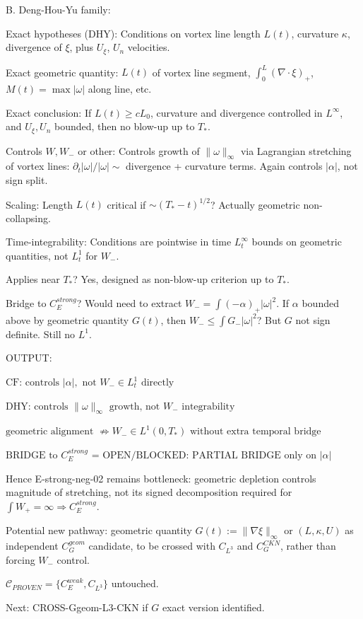 \documentclass[11pt]{article}
\begin{document}
B. Deng-Hou-Yu family:

Exact hypotheses (DHY):
Conditions on vortex line length $L(t)$, curvature $\kappa$, divergence of $\xi$, plus $U_\xi$, $U_n$ velocities.

Exact geometric quantity:
$L(t)$ of vortex line segment, $\int_0^{L} (\nabla\cdot\xi)_+$, $M(t)=\max |\omega|$ along line, etc.

Exact conclusion:
If $L(t)\ge c L_0$, curvature and divergence controlled in $L^\infty$, and $U_\xi,U_n$ bounded, then no blow-up up to $T_*$.

Controls $W,W_-$ or other:
Controls growth of $\|\omega\|_\infty$ via Lagrangian stretching of vortex lines: $\partial_t |\omega| / |\omega| \sim$ divergence + curvature terms. Again controls $|\alpha|$, not sign split.

Scaling:
Length $L(t)$ critical if $\sim (T_*-t)^{1/2}$? Actually geometric non-collapsing.

Time-integrability:
Conditions are pointwise in time $L^\infty_t$ bounds on geometric quantities, not $L^1_t$ for $W_-$.

Applies near $T_*$? Yes, designed as non-blow-up criterion up to $T_*$.

Bridge to $C_E^{strong}$?
Would need to extract $W_-=\int (-\alpha)_+ |\omega|^2$. If $\alpha$ bounded above by geometric quantity $G(t)$, then $W_-\le \int G_- |\omega|^2$? But $G$ not sign definite. Still no $L^1$.

OUTPUT:

$\boxed{\text{CF: controls }|\alpha|,\text{ not }W_-\in L^1_t\text{ directly}}$

$\boxed{\text{DHY: controls }\|\omega\|_\infty\text{ growth, not }W_-\text{ integrability}}$

$\boxed{\text{geometric alignment }\not\Rightarrow W_-\in L^1(0,T_*)\text{ without extra temporal bridge}}$

$\boxed{\text{BRIDGE to }C_E^{strong}\text{ = OPEN/BLOCKED: PARTIAL BRIDGE only on }|\alpha|}$

Hence E-strong-neg-02 remains bottleneck: geometric depletion controls magnitude of stretching, not its signed decomposition required for $\int W_+=\infty\Rightarrow C_E^{strong}$.

Potential new pathway: geometric quantity $G(t):=\|\nabla\xi\|_\infty$ or $(L,\kappa,U)$ as independent $C_G^{geom}$ candidate, to be crossed with $C_{L^3}$ and $C_G^{CKN}$, rather than forcing $W_-$ control.

$\mathcal{C}_{PROVEN}=\{C_E^{weak},C_{L^3}\}$ untouched.

Next: CROSS-Ggeom-L3-CKN if $G$ exact version identified.
\end{document}

